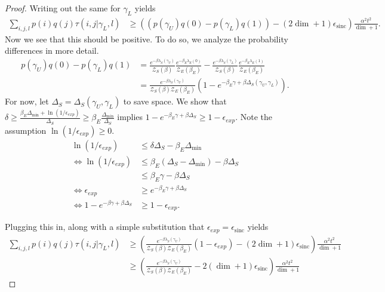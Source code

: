 \documentclass{article}
\newcommand{\parens}[1]{\left( #1 \right)}
\newcommand{\partfun}{\mathcal{Z}}
\DeclareMathOperator{\sinc}{sinc}
\begin{document}
\begin{proof}
     Writing out the same for $\gamma_L$ yields
     \begin{align}
        \sum_{i,j,l} p(i) q(j) \tau(i,j | \gamma_L, l) &\geq \parens{(p(\gamma_U) q(0) - p(\gamma_L) q(1))  - (2 \dim + 1) \epsilon_{\sinc}} \frac{\alpha^2 t^2}{\dim + 1}.
     \end{align}
     Now we see that this should be positive. To do so, we analyze the probability differences in more detail.
     \begin{align}
        p(\gamma_U) q(0) - p(\gamma_L) q(1) &= \frac{e^{-\beta \lambda_S(\gamma_U)}}{\partfun_S(\beta)} \frac{e^{-\beta_E \lambda_E(0)}}{\partfun_E(\beta_E)} - \frac{e^{-\beta \lambda_S(\gamma_L)}}{\partfun_S(\beta)} \frac{e^{-\beta_E \lambda_E(1)}}{\partfun_E(\beta_E)} \\
        &= \frac{e^{-\beta \lambda_S(\gamma_U)}}{\partfun_S(\beta) \partfun_E(\beta_E)} \parens{1 - e^{-\beta_E \gamma + \beta \Delta_S(\gamma_U, \gamma_L)}}.
     \end{align}
     For now, let $\Delta_S = \Delta_S(\gamma_U, \gamma_L)$ to save space. We show that $\delta \geq \frac{\beta_E \Delta_{\min} + \ln (1 / \epsilon_{exp})}{\Delta_S} \geq \beta_E \frac{\Delta_{\min}}{\Delta_S}$ implies $1 - e^{-\beta_E \gamma + \beta \Delta_S} \geq 1 - \epsilon_{exp}$. Note the assumption $\ln (1/ \epsilon_{exp}) \geq 0$. 
     \begin{align}
        \ln (1 / \epsilon_{exp}) &\leq \delta \Delta_S - \beta_E \Delta_{\min} \\
        \iff \ln (1 / \epsilon_{exp}) &\leq \beta_E (\Delta_S - \Delta_{\min}) - \beta \Delta_S \\
        &\leq \beta_E \gamma - \beta \Delta_S \\
        \iff \epsilon_{exp} &\geq e^{-\beta_E \gamma + \beta \Delta_S} \\
        \iff 1 - e^{-\beta \gamma + \beta \Delta_S}  &\geq 1 - \epsilon_{exp}.
     \end{align}

     Plugging this in, along with a simple substitution that $\epsilon_{exp} = \epsilon_{\sinc}$ yields 
     \begin{align}
        \sum_{i,j,l} p(i) q(j) \tau(i,j | \gamma_L, l) &\geq \parens{\frac{e^{-\beta \lambda_S(\gamma_U)}}{\partfun_S(\beta) \partfun_E(\beta_E)} (1 - \epsilon_{exp}) - (2 \dim + 1) \epsilon_{\sinc}} \frac{\alpha^2 t^2}{\dim + 1} \\
        &\geq \parens{\frac{e^{-\beta \lambda_S(\gamma_U)}}{\partfun_S(\beta) \partfun_E(\beta_E)} - 2 (\dim + 1) \epsilon_{\sinc}} \frac{\alpha^2 t^2}{\dim + 1} 
     \end{align}
\end{proof}
\end{document}
